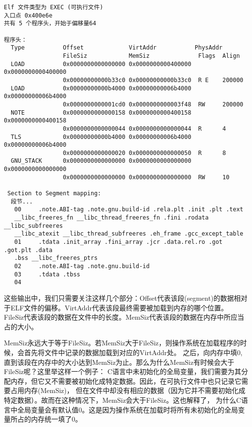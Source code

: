 \begin{verbatim}
Elf 文件类型为 EXEC (可执行文件)
入口点 0x400e6e
共有 5 个程序头，开始于偏移量64

程序头：
  Type           Offset             VirtAddr           PhysAddr
                 FileSiz            MemSiz              Flags  Align
  LOAD           0x0000000000000000 0x0000000000400000 0x0000000000400000
                 0x00000000000b33c0 0x00000000000b33c0  R E    200000
  LOAD           0x00000000000b4000 0x00000000006b4000 0x00000000006b4000
                 0x0000000000001cd0 0x0000000000003f48  RW     200000
  NOTE           0x0000000000000158 0x0000000000400158 0x0000000000400158
                 0x0000000000000044 0x0000000000000044  R      4
  TLS            0x00000000000b4000 0x00000000006b4000 0x00000000006b4000
                 0x0000000000000020 0x0000000000000050  R      8
  GNU_STACK      0x0000000000000000 0x0000000000000000 0x0000000000000000
                 0x0000000000000000 0x0000000000000000  RW     10

 Section to Segment mapping:
  段节...
   00     .note.ABI-tag .note.gnu.build-id .rela.plt .init .plt .text 
   __libc_freeres_fn __libc_thread_freeres_fn .fini .rodata __libc_subfreeres 
   __libc_atexit __libc_thread_subfreeres .eh_frame .gcc_except_table 
   01     .tdata .init_array .fini_array .jcr .data.rel.ro .got .got.plt .data 
   .bss __libc_freeres_ptrs 
   02     .note.ABI-tag .note.gnu.build-id 
   03     .tdata .tbss 
   04
\end{verbatim}

这些输出中，我们只需要关注这样几个部分：Offset代表该段(segment)的数据相对于ELF文件的偏移。VirtAddr代表该段最终需要被加载到内存的哪个位置。
FileSiz代表该段的数据在文件中的长度。MemSiz代表该段的数据在内存中所应当占的大小。

\begin{note}
MemSiz永远大于等于FileSiz。若MemSiz大于FileSiz，则操作系统在加载程序的时候，会首先将文件中记录的数据加载到对应的VirtAddr处。
之后，向内存中填0,直到该段在内存中的大小达到MemSiz为止。那么为什么MemSiz有时候会大于FileSiz呢？这里举这样一个例子：
C语言中未初始化的全局变量，我们需要为其分配内存，但它又不需要被初始化成特定数据。因此，在可执行文件中也只记录它需要占用内存(MemSiz)，
但在文件中却没有相应的数据（因为它并不需要初始化成特定数据）。故而在这种情况下，MemSiz会大于FileSiz。这也解释了，
为什么C语言中全局变量会有默认值0。这是因为操作系统在加载时将所有未初始化的全局变量所占的内存统一填了0。
\end{note}

